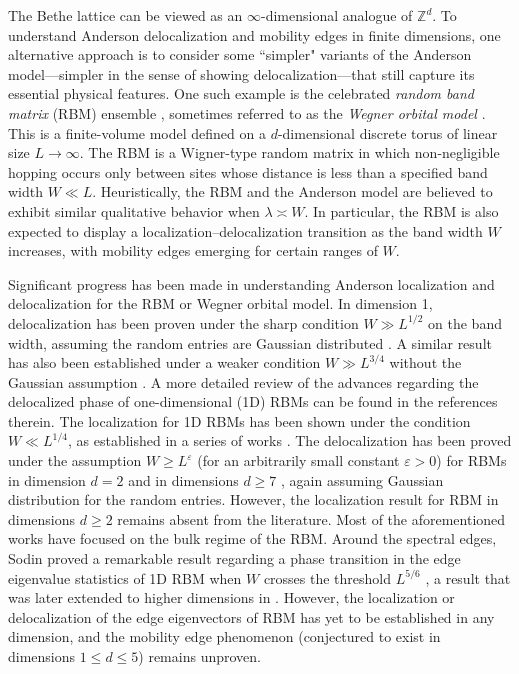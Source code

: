 \documentclass[10pt,reqno]{amsart}
\numberwithin{equation}{section}
\numberwithin{figure}{section}
\theoremstyle{plain} %
\theoremstyle{definition} %
\newcommand{\Z}{\mathbb{Z}}
\newcommand{\e}{{\varepsilon}}
\numberwithin{equation}{section}
\begin{document}
The Bethe lattice can be viewed as an $\infty$-dimensional analogue of $\Z^d$. To understand Anderson delocalization and mobility edges in finite dimensions, one alternative approach is to consider some ``simpler" variants of the Anderson model---simpler in the sense of showing delocalization---that still capture its essential physical features. One such example is the celebrated \emph{random band matrix} (RBM) ensemble \cite{scalingabndCGMLIF1990PRL,ConJ-Ref2,ScalingPropertyBandMatrixFYMA1991PRL}, sometimes referred to as the \emph{Wegner orbital model} \cite{Wegner1,Wegner2, Wegner3}. 
This is a finite-volume model defined on a $d$-dimensional discrete torus of linear size $L\to \infty$. The RBM is a Wigner-type random matrix in which non-negligible hopping occurs only between sites whose distance is less than a specified band width $W \ll L$. 
Heuristically, the RBM and the Anderson model are believed to exhibit similar qualitative behavior when $\lambda \asymp  W$. In particular, the RBM is also expected to display a localization–delocalization transition as the band width $W$ increases, with mobility edges emerging for certain ranges of $W$. 

Significant progress has been made in understanding Anderson localization and delocalization for the RBM or Wegner orbital model. In dimension 1, delocalization has been proven under the sharp condition $W\gg L^{1/2}$ on the band width, assuming the random entries are Gaussian distributed \cite{yau2025delocalizationonedimensionalrandomband}. A similar result has also been established under a weaker condition $W\gg L^{3/4}$ without the Gaussian assumption \cite{PartI,PartII,Band1D_III}. 
A more detailed review of the advances regarding the delocalized phase of one-dimensional (1D) RBMs can be found in the references therein. The localization for 1D RBMs has been shown under the condition $W\ll L^{1/4}$, as established in a series of works \cite{Sch2009,Wegner,CS1_4,CPSS1_4}. 
The delocalization has been proved under the assumption $W\ge L^\e$ (for an arbitrarily small constant $\e>0$) for RBMs in dimension $d=2$ \cite{Band2D} and in dimensions $d\ge 7$ \cite{CFHJBulkBandAOP2024,yang2021delocalizationquantumdiffusionrandom,YYYTexpansion2022CMP}, again assuming Gaussian distribution for the random entries. 
However, the localization result for RBM in dimensions $d\ge 2$ remains absent from the literature.
Most of the aforementioned works have focused on the bulk regime of the RBM. Around the spectral edges, Sodin proved a remarkable result regarding a phase transition in the edge eigenvalue statistics of 1D RBM when $W$ crosses the threshold $L^{5/6}$ \cite{Sod2010}, a result that was later extended to higher dimensions in \cite{Band_Edge123}. 
However, the localization or delocalization of the edge eigenvectors of RBM has yet to be established in any dimension, and the mobility edge phenomenon (conjectured to exist in dimensions $1\le d\le 5$) remains unproven. 
\end{document}
